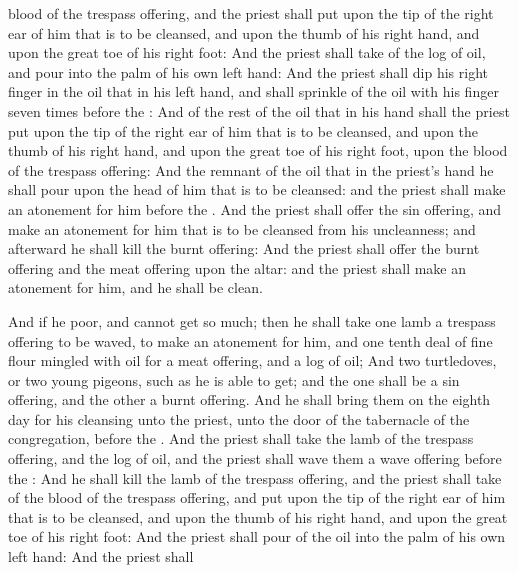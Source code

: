 {blood of the trespass
offering, and the
priest shall
put
{} upon the
tip of the
right
ear of him that is to be
cleansed, and upon the
thumb of his
right
hand, and upon the great
toe of his
right
foot:
And the
priest shall
take
{} of the
log of
oil, and
pour
{} into the
palm of his
own left
hand:
And the
priest shall
dip his
right
finger in the
oil that
{} in his
left
hand, and shall
sprinkle of the
oil with his
finger
seven
times
before the
{}:
And of the
rest of the
oil that
{} in his
hand shall the
priest
put upon the
tip of the
right
ear of him that is to be
cleansed, and upon the
thumb of his
right
hand, and upon the great
toe of his
right
foot, upon the
blood of the trespass
offering:
And the
remnant of the
oil that
{} in the
priest’s
hand he shall
pour upon the
head of him that is to be
cleansed: and the
priest shall make an
atonement for him
before the
{}.
And the
priest shall
offer the sin
offering, and make an
atonement for him that is to be
cleansed from his
uncleanness; and
afterward he shall
kill the burnt
offering:
And the
priest shall
offer the burnt
offering and the meat
offering upon the
altar: and the
priest shall make an
atonement for him, and he shall be
clean.
\par }{\PP {}And if he
{}
poor, and cannot
get so much; then he shall
take
one
lamb
{} a trespass
offering to be
waved, to make an
atonement for him, and
one tenth
deal of fine
flour
mingled with
oil for a meat
offering, and a
log of
oil;
And
two
turtledoves, or
two
young
pigeons, such as he is able to
get; and the
one shall be a sin
offering, and the
other a burnt
offering.
And he shall
bring them on the
eighth
day for his
cleansing unto the
priest, unto the
door of the
tabernacle of the
congregation,
before the
{}.
And the
priest shall
take the
lamb of the trespass
offering, and the
log of
oil, and the
priest shall
wave them
{} a wave
offering
before the
{}:
And he shall
kill the
lamb of the trespass
offering, and the
priest shall
take
{} of the
blood of the trespass
offering, and
put
{} upon the
tip of the
right
ear of him that is to be
cleansed, and upon the
thumb of his
right
hand, and upon the great
toe of his
right
foot:
And the
priest shall
pour of the
oil into the
palm of his
own left
hand:
And the
priest shall
}
